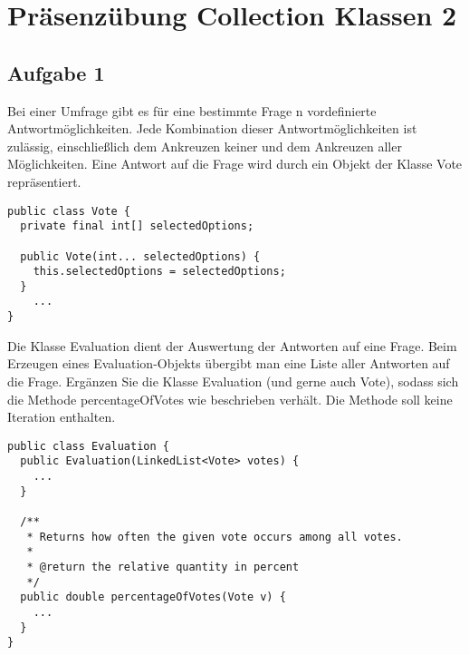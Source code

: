 \chapter{Präsenzübung Collection \newline Klassen 2}

\section{Aufgabe 1}
Bei einer Umfrage gibt es für eine bestimmte Frage n vordefinierte
Antwortmöglichkeiten. Jede Kombination dieser Antwortmöglichkeiten ist
zulässig, einschließlich dem Ankreuzen keiner und dem Ankreuzen aller
Möglichkeiten. Eine Antwort auf die Frage wird durch ein Objekt der Klasse Vote
repräsentiert.

\begin{lstlisting}
public class Vote {
  private final int[] selectedOptions;

  public Vote(int... selectedOptions) {
    this.selectedOptions = selectedOptions;
  }
    ...
}
\end{lstlisting}

Die Klasse Evaluation dient der Auswertung der Antworten auf eine Frage. Beim
Erzeugen eines Evaluation-Objekts übergibt man eine Liste aller Antworten auf
die Frage. Ergänzen Sie die Klasse Evaluation (und gerne auch Vote), sodass
sich die Methode percentageOfVotes wie beschrieben verhält. Die Methode soll
keine Iteration enthalten.

\begin{lstlisting}
public class Evaluation {
  public Evaluation(LinkedList<Vote> votes) {
    ...
  }

  /**
   * Returns how often the given vote occurs among all votes.
   *
   * @return the relative quantity in percent
   */
  public double percentageOfVotes(Vote v) {
    ...
  }
}
\end{lstlisting}

